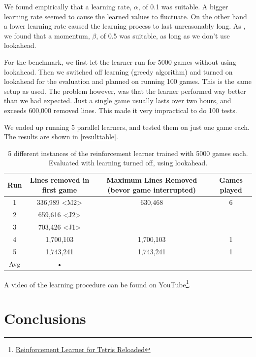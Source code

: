 \documentclass{ml}
\begin{document}
We found empirically that a learning rate, $\alpha$, of 0.1 was suitable. A bigger learning rate seemed to cause the learned values to fluctuate.
On the other hand a lower learning rate caused the learning process to last unreasonably long. 
As \cite{zucker2009learning}, we found that a momentum, $\beta$, of 0.5 was suitable, as long as we don't use lookahead.

For the benchmark, we first let the learner run for 5000 games without using lookahead.
Then we switched off learning (greedy algorithm) and turned on lookahead for the evaluation and planned on running 100 games.
This is the same setup as \cite{zucker2009learning} used.
The problem however, was that the learner performed way better than we had expected. Just a single game usually lasts over two hours, and exceeds 600,000 removed lines.
This made it very impractical to do 100 tests. 

We ended up running 5 parallel learners, and tested them on just one game each. 
The results are shown in \autoref{resulttable}.

\begin{table}
\begin{center}
\begin{tabular}{|c|c|c|c|}
\hline 
Run & Lines removed in first game & Maximum Lines Removed (bevor game interrupted) & Games played\\ 
\hline 
1 & 336,989 <M2> & 630,468 & 6 \\ 
\hline 
2 & 659,616 <J2> &&\\ 
\hline 
3 & 703,426 <J1> &&\\ 
\hline 
4 & 1,700,103 & 1,700,103 & 1\\ 
\hline 
5 & 1,743,241 & 1,743,241 & 1\\ 
\hline 
Avg & • \\ 
\hline 
\end{tabular}
\caption{5 different instances of the reinforcement learner trained with 5000 games each. Evaluated with learning turned off, using lookahead.}
\label{resulttable}
\end{center}
\end{table}


A video of the learning procedure can be found on YouTube\footnote{\href{http://www.youtube.com/watch?v=DXgtzFiRHdc}{Reinforcement Learner for Tetris Reloaded}}.


\section{Conclusions}
\label{conclusions}
\end{document}
